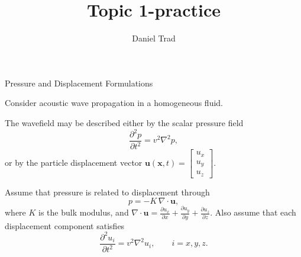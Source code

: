 \documentclass{beamer}
\title{Topic 1-practice}
\author{Daniel Trad}
\date{}
\begin{document}
\frame{\titlepage}

\begin{frame}{Pressure and Displacement Formulations}
\small

Consider acoustic wave propagation in a homogeneous fluid.

\vspace{0.2cm}

The wavefield may be described either by the scalar pressure field
\[
\frac{\partial^2 p}{\partial t^2}=v^2\nabla^2 p,
\]
or by the particle displacement vector $ \bm{u}(\bm{x},t)=\begin{bmatrix}u_x \\ u_y \\ u_z\end{bmatrix}.$

\begin{tcolorbox}[title=Given information,colback=blue!5!white,colframe=blue!60!black]
Assume that pressure is related to displacement through
\[
p=-K\,\nabla\cdot\bm{u},
\]
where \(K\) is the bulk modulus, and $\nabla\cdot\bm{u}=\frac{\partial u_x}{\partial x}+\frac{\partial u_y}{\partial y}+\frac{\partial u_z}{\partial z}.$
\vspace{0.15cm}
Also assume that each displacement component satisfies
\[
\frac{\partial^2 u_i}{\partial t^2}=v^2\nabla^2 u_i,
\qquad i=x,y,z.
\]
\end{tcolorbox}

\end{frame}
\end{document}
